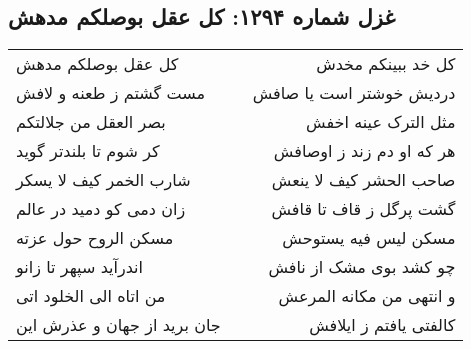 \begin{center}
\section*{غزل شماره ۱۲۹۴: کل عقل بوصلکم مدهش}
\label{sec:1294}
\begin{longtable}{l p{0.5cm} r}
کل عقل بوصلکم مدهش
&&
کل خد ببینکم مخدش
\\
مست گشتم ز طعنه و لافش
&&
دردیش خوشتر است یا صافش
\\
بصر العقل من جلالتکم
&&
مثل الترک عینه اخفش
\\
کر شوم تا بلندتر گوید
&&
هر که او دم زند ز اوصافش
\\
شارب الخمر کیف لا یسکر
&&
صاحب الحشر کیف لا ینعش
\\
زان دمی کو دمید در عالم
&&
گشت پرگل ز قاف تا قافش
\\
مسکن الروح حول عزته
&&
مسکن لیس فیه یستوحش
\\
اندرآید سپهر تا زانو
&&
چو کشد بوی مشک از نافش
\\
من اتاه الی الخلود اتی
&&
و انتهی من مکانه المرعش
\\
جان برید از جهان و عذرش این
&&
کالفتی یافتم ز ایلافش
\\
\end{longtable}
\end{center}
